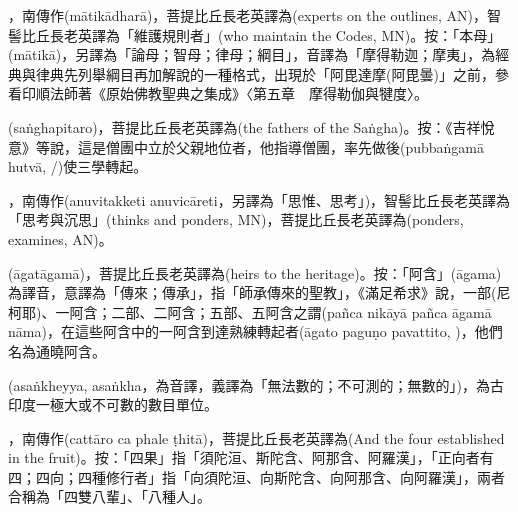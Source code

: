 \startitemgroup[noteitems]
\item{}，南傳作(mātikādharā)，菩提比丘長老英譯為(experts on the outlines, AN)，智髻比丘長老英譯為「維護規則者」(who maintain the Codes, MN)。按：「本母」(mātikā)，另譯為「論母；智母；律母；綱目」，音譯為「摩得勒迦；摩夷」，為經典與律典先列舉綱目再加解說的一種格式，出現於「阿毘達摩(阿毘曇)」之前，參看印順法師著《原始佛教聖典之集成》〈第五章　摩得勒伽與犍度〉。
\stopitemgroup

\startitemgroup[noteitems]
\item{}(saṅghapitaro)，菩提比丘長老英譯為(the fathers of the Saṅgha)。按：《吉祥悅意》等說，這是僧團中立於父親地位者，他指導僧團，率先做後(pubbaṅgamā hutvā, /)使三學轉起。
\stopitemgroup

\startitemgroup[noteitems]
\item{}，南傳作(anuvitakketi anuvicāreti，另譯為「思惟、思考」)，智髻比丘長老英譯為「思考與沉思」(thinks and ponders, MN)，菩提比丘長老英譯為(ponders, examines, AN)。
\stopitemgroup

\startitemgroup[noteitems]
\item{}(āgatāgamā)，菩提比丘長老英譯為(heirs to the heritage)。按：「阿含」(āgama)為譯音，意譯為「傳來；傳承」，指「師承傳來的聖教」，《滿足希求》說，一部(尼柯耶)、一阿含；二部、二阿含；五部、五阿含之謂(pañca nikāyā pañca āgamā nāma)，在這些阿含中的一阿含到達熟練轉起者(āgato paguṇo pavattito, )，他們名為通曉阿含。
\stopitemgroup

\startitemgroup[noteitems]
\item{}(asaṅkheyya, asaṅkha，為音譯，義譯為「無法數的；不可測的；無數的」)，為古印度一極大或不可數的數目單位。
\stopitemgroup

\startitemgroup[noteitems]
\item{}，南傳作(cattāro ca phale ṭhitā)，菩提比丘長老英譯為(And the four established in the fruit)。按：「四果」指「須陀洹、斯陀含、阿那含、阿羅漢」，「正向者有四；四向；四種修行者」指「向須陀洹、向斯陀含、向阿那含、向阿羅漢」，兩者合稱為「四雙八輩」、「八種人」。
\stopitemgroup

